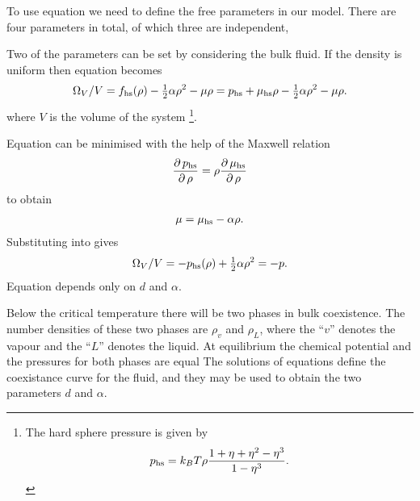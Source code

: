 To use equation  
we need to define the free parameters in our model.
There are four parameters in total, of which three are independent,

Two of the parameters can be set by considering the bulk fluid.
If the density is uniform then equation  becomes
\begin{align}
   \Omega_V/V =  f_{\text{hs}}(\rho)  -  \tfrac{1}{2}\alpha \rho^2 -  \mu \rho= p_{\text{hs}} + \mu_{\text{hs}} \rho  -  \tfrac{1}{2} \alpha \rho^2 -  \mu \rho. \label{eqn:nuc:OmegaVBulk}
\end{align}
where $V$ is the volume of the system%
\footnote{The hard sphere pressure is given by
\begin{align}
 p_{\text{hs}} = k_B T \rho \frac{1+\eta +\eta^2-\eta^3}{1-\eta^3}. \label{eqn:nuc:HSpressure}
\end{align}
}.

Equation   can be minimised with the help of the Maxwell relation
\begin{align}
  \frac{\operatorname{\partial} p_{\text{hs}}}{\operatorname{\partial} \rho} = \rho \frac{\operatorname{\partial} \mu_{\text{hs}}}{\operatorname{\partial} \rho} 
\end{align}
to obtain
\begin{align}
  \mu = \mu_{\text{hs}} - \alpha \rho. \label{eqn:nuc:muBulk}
\end{align}
Substituting  into  gives
\begin{align}
   \Omega_V/V = -p_{\text{hs}}(\rho) + \tfrac{1}{2} \alpha \rho^2 = -p.
   \label{eqn:nuc:OmegaVBulkP}
\end{align}
Equation  depends only on $d$ and $\alpha$.

Below the critical temperature there will be 
two phases in  bulk coexistence.
The number densities of these two phases are $\rho_v$ and $\rho_L$,
where the ``$v$'' denotes the vapour and the ``$L$'' denotes the liquid.
At equilibrium the chemical potential and the pressures for both phases are equal
The solutions of equations  define the coexistance curve for the fluid,
and they may be used to obtain the two parameters $d$ and $\alpha$.


